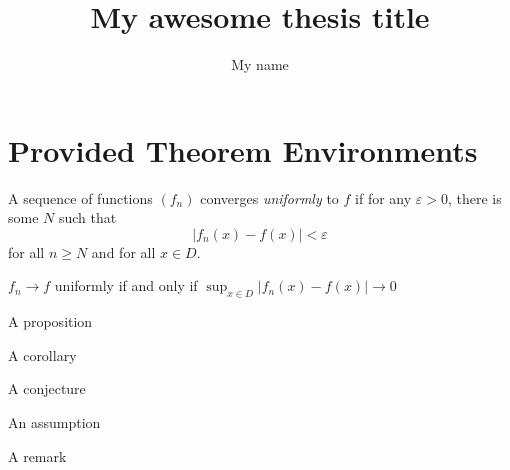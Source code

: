 \documentclass[
    11pt,
    a4paper, 
    ]{mphilthesis}
\author{My name}
\title{My awesome thesis title}
\affiliation{University of A}
\begin{document}
\maketitle
\begin{abstract}
\blindtext
\end{abstract}

\section{Provided Theorem Environments}
\begin{definition}
    A sequence of functions $(f_n)$ converges \emph{uniformly} to $f$ if 
    for any $\varepsilon>0$, there is some $N$ such that 
    \[|f_n(x) - f(x)|< \varepsilon\]
    for all $n\geq N$ and for all $x\in D$.
\end{definition}

\begin{lemma}
    $f_n \to f$ uniformly if and only if 
    $\sup_{x\in D}|f_n(x) - f(x)| \to 0$
\end{lemma}

\begin{prop}
    A proposition
\end{prop}


\begin{corollary}
    A corollary
\end{corollary}

\begin{conjecture}
    A conjecture
\end{conjecture}

\begin{assumption}
    An assumption
\end{assumption}

\begin{remark}
    A remark
\end{remark}
\end{document}
